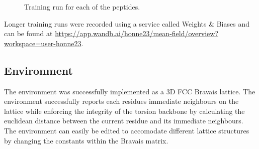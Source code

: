 \begin{figure}[!htb]
    \centering     
    \caption{Training run for each of the peptides.}
\end{figure}

Longer training runs were recorded using a service called Weights \& Biases
and can be found at \url{https://app.wandb.ai/honne23/mean-field/overview?workspace=user-honne23}.

\subsection{Environment}
The environment was successfully implemented as a 3D FCC Bravais lattice.
The environment successfully reports each residues immediate neighbours
on the lattice while enforcing the integrity of the torsion backbone
by calculating the euclidean distance between the current residue and
its immediate neighbours. The environment can easily be edited
to accomodate different lattice structures by changing the constants
within the Bravais matrix.

